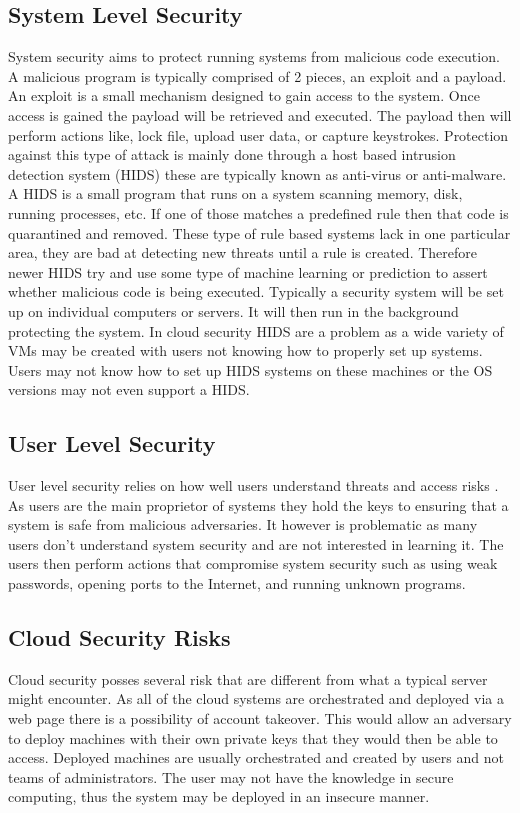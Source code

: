 \documentclass[12pt]{article}
\begin{document}
\subsection{System Level Security}
System security aims to protect running systems from malicious code execution. A malicious program is typically comprised of 2 pieces, an exploit and a payload. An exploit is a small mechanism designed to gain access to the system. Once access is gained the payload will be retrieved and executed. The payload then will perform actions like, lock file, upload user data, or capture keystrokes. Protection against this type of attack is mainly done through a host based intrusion detection system (HIDS) these are typically known as anti-virus or anti-malware. A HIDS is a small program that runs on a system scanning memory, disk, running processes, etc. If one of those matches a predefined rule then that code is quarantined and removed. These type of rule based systems lack in one particular area, they are bad at detecting new threats until a rule is created. Therefore newer HIDS try and use some type of machine learning or prediction to assert whether malicious code is being executed. Typically a security system will be set up on individual computers or servers. It will then run in the background protecting the system. In cloud security HIDS are a problem \cite{modi2013survey} as a wide variety of VMs may be created with users not knowing how to properly set up systems. Users may not know how to set up HIDS systems on these machines or the OS versions may not even support a HIDS.

\subsection{User Level Security}
User level security relies on how well users understand threats and access risks \cite{stanton2005analysis}. As users are the main proprietor of systems they hold the keys to ensuring that a system is safe from malicious adversaries. It however is problematic as many users don't understand system security and are not interested in learning it. The users then perform actions that compromise system security such as using weak passwords, opening ports to the Internet, and running unknown programs.

\subsection{Cloud Security Risks}
Cloud security posses several risk that are different from what a typical server might encounter. As all of the cloud systems are orchestrated and deployed via a web page there is a possibility of account takeover. This would allow an adversary to deploy machines with their own private keys that they would then be able to access. Deployed machines are usually orchestrated and created by users and not teams of administrators. The user may not have the knowledge in secure computing, thus the system may be deployed in an insecure manner.
\end{document}
